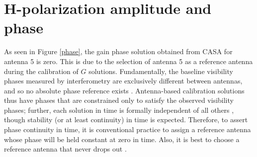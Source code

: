 \section{H-polarization amplitude and phase}
\label{Hp}
As seen in Figure \ref{phase}, the gain phase solution obtained from CASA for antenna 5 is zero. This is due to the selection of antenna 5 as a reference antenna during the calibration of $G$ solutions. Fundamentally, the baseline visibility phases measured by interferometry are exclusively different between antennas, and so no absolute phase reference exists \citep{taylor1999synthesis}. Antenna-based calibration solutions thus have phases that are constrained only to satisfy the observed visibility phases; further, each solution in time is formally independent of all others \citep{taylor1999synthesis}, though stability (or at least continuity) in time is expected. Therefore, to assert phase continuity in time, it is conventional practice to assign a reference antenna whose phase will be held constant at zero in time. Also, it is best to choose a reference antenna that never drops out \citep{editioncasa}. 

